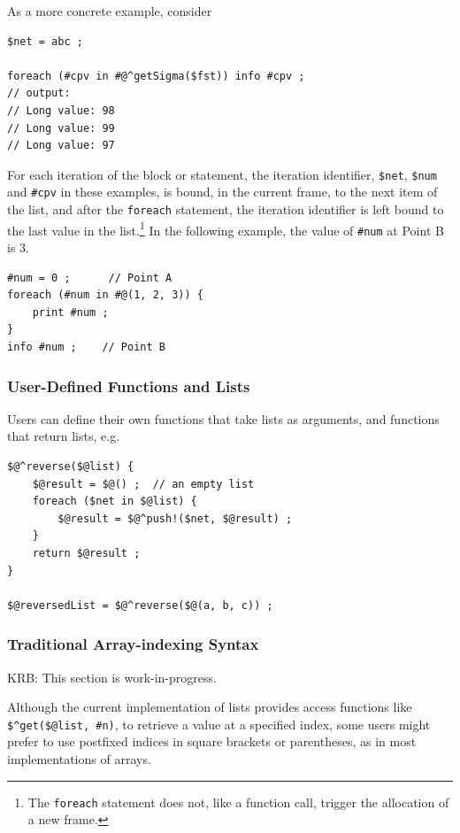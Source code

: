 \documentclass[letterpaper,12pt]{article}
\begin{document}
\noindent
As a more concrete example, consider

\begin{Verbatim}[fontsize=\small]
$net = abc ;

foreach (#cpv in #@^getSigma($fst)) info #cpv ;
// output:
// Long value: 98
// Long value: 99
// Long value: 97
\end{Verbatim}

For each iteration of the block or statement, the iteration identifier,
\verb!$net!, \verb!$num! and \verb!#cpv! in these examples, is bound, in
the current frame, to the next item of the list, and after the
\texttt{foreach} statement, the iteration identifier is left bound to the
last value in the list.\footnote{The \texttt{foreach} statement does not,
like a function call, trigger the allocation of a new frame.}  In the
following example, the value of \verb!#num! at Point B is 3.

\begin{Verbatim}[fontsize=\small]
#num = 0 ;      // Point A
foreach (#num in #@(1, 2, 3)) {
	print #num ;
}
info #num ;    // Point B
\end{Verbatim}

\subsubsection{User-Defined Functions and Lists}


Users can define their own functions that take lists as arguments, and functions
that return lists, e.g.\@

\begin{Verbatim}[fontsize=\small]
$@^reverse($@list) {
    $@result = $@() ;  // an empty list
    foreach ($net in $@list) {
        $@result = $@^push!($net, $@result) ;
    }
    return $@result ;
}

$@reversedList = $@^reverse($@(a, b, c)) ;
\end{Verbatim}


\subsubsection{Traditional Array-indexing Syntax}


KRB:  This section is work-in-progress.

Although the current implementation of lists provides access functions like
\verb!$^get($@list, #n)!, to retrieve a value at a specified index, 
some users might prefer to use postfixed indices in
square brackets or parentheses, as in most implementations of arrays.
\end{document}
